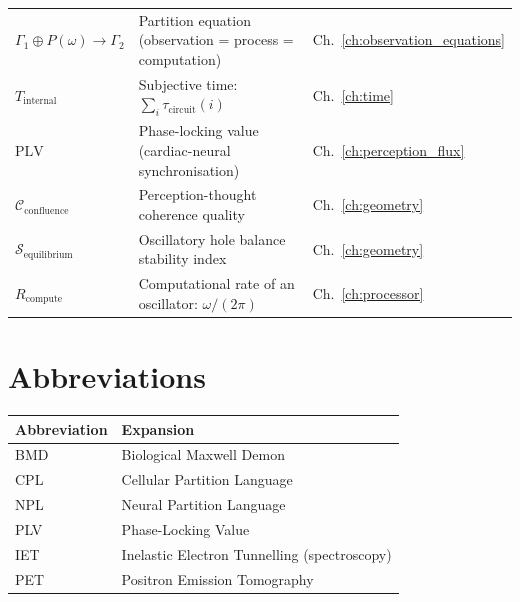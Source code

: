 \begin{longtable}{lll}
$\Gamma_1 \oplus P(\omega) \to \Gamma_2$ & Partition equation (observation = process = computation) & Ch.~\ref{ch:observation_equations} \\
$T_{\mathrm{internal}}$ & Subjective time: $\sum_i \tau_{\mathrm{circuit}}(i)$ & Ch.~\ref{ch:time} \\
$\mathrm{PLV}$ & Phase-locking value (cardiac-neural synchronisation) & Ch.~\ref{ch:perception_flux} \\
$\mathcal{C}_{\mathrm{confluence}}$ & Perception-thought coherence quality & Ch.~\ref{ch:geometry} \\
$\mathcal{S}_{\mathrm{equilibrium}}$ & Oscillatory hole balance stability index & Ch.~\ref{ch:geometry} \\
$R_{\mathrm{compute}}$ & Computational rate of an oscillator: $\omega/(2\pi)$ & Ch.~\ref{ch:processor} \\
\bottomrule
\end{longtable}

\section{Abbreviations}

\begin{longtable}{ll}
\toprule
\textbf{Abbreviation} & \textbf{Expansion} \\
\midrule
\endhead
BMD & Biological Maxwell Demon \\
CPL & Cellular Partition Language \\
NPL & Neural Partition Language \\
PLV & Phase-Locking Value \\
IET & Inelastic Electron Tunnelling (spectroscopy) \\
PET & Positron Emission Tomography \\
\bottomrule
\end{longtable}

